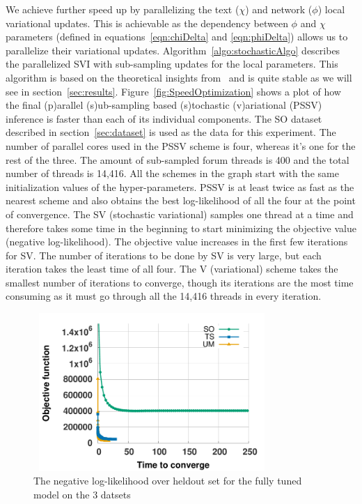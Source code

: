 \documentclass{sig-alternate}
\begin{document}
We achieve further speed up by parallelizing the text ($\chi$) and network
($\phi$) local variational updates. This is achievable  as the
dependency between $\phi$ and $\chi$ parameters (defined in
equations~\ref{eqn:chiDelta} and \ref{eqn:phiDelta}) allows us to parallelize their
variational updates.
Algorithm~\ref{algo:stochasticAlgo} describes the parallelized SVI with
sub-sampling updates for the local parameters. This algorithm is 
based on the theoretical insights from~\cite{Hoffman:2013:SVI} and is 
quite stable as we will see in section~\ref{sec:results}. 
Figure~\ref{fig:SpeedOptimization} 
shows a plot of how the final (p)arallel (s)ub-sampling based (s)tochastic
(v)ariational (PSSV) inference is faster than each of its individual components.
The SO dataset described in section~\ref{sec:dataset} is used as the data for this 
experiment.
The number of parallel cores used in the PSSV scheme is four, whereas it's one
for the rest of the three.
The amount of sub-sampled forum threads is 400 and the total number of threads is 14,416.
All the schemes in the graph start with the same initialization values of the
hyper-parameters. PSSV is at least twice as fast as the nearest scheme and 
also obtains the best log-likelihood of all the four at the point of convergence.
The SV (stochastic variational) samples one thread at a time and therefore
takes some time in the beginning to start minimizing the objective value
(negative log-likelihood).
The objective value increases in the first few iterations for SV. The number of
iterations to be done by SV is very large, but each iteration takes the least time of
all four. The V (variational) scheme takes the smallest number of iterations to
converge, though its iterations are the most time consuming as it must go
through all the 14,416 threads in every iteration. 



\begin{figure}
\begin{center}
\includegraphics[height=6cm,width=9cm]{figs/data_ll.pdf}
\end{center}
\vspace*{-2\baselineskip}
\caption{The negative log-likelihood over heldout set for the fully tuned model on the
3 datsets}
\label{fig:finalLLheld}
\end{figure}
\end{document}
